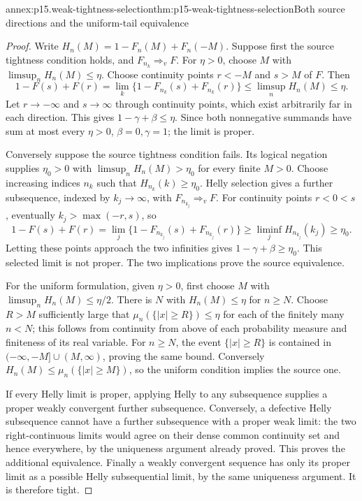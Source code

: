 \begin{annexitem}{annex:p15.weak-tightness-selection}{thm:p15-weak-tightness-selection}{Both source directions and the uniform-tail equivalence}
\begin{proof}
Write \(H_n(M)=1-F_n(M)+F_n(-M)\).
Suppose first the source tightness condition holds, and
\(F_{n_k}\Rightarrow_v F\).
For \(\eta>0\), choose \(M\) with \(\limsup_nH_n(M)\leq\eta\).
Choose continuity points \(r<-M\) and \(s>M\) of \(F\).
Then
\[
 1-F(s)+F(r)
   =\lim_k\{1-F_{n_k}(s)+F_{n_k}(r)\}
   \leq\limsup_nH_n(M)\leq\eta.
\]
Let \(r\to-\infty\) and \(s\to\infty\) through continuity
points, which exist arbitrarily far in each direction.
This gives \(1-\gamma+\beta\leq\eta\).
Since both nonnegative summands have sum at most every
\(\eta>0\), \(\beta=0,\gamma=1\); the limit is proper.

Conversely suppose the source tightness condition fails.
Its logical negation supplies \(\eta_0>0\) with
\(\limsup_nH_n(M)>\eta_0\) for every finite \(M>0\).
Choose increasing indices \(n_k\) such that \(H_{n_k}(k)\geq\eta_0\).
Helly selection gives a further subsequence, indexed by
\(k_j\to\infty\), with \(F_{n_{k_j}}\Rightarrow_v F\).
For continuity points \(r<0<s\), eventually \(k_j>\max(-r,s)\),
so
\[
 1-F(s)+F(r)
 =\lim_j\{1-F_{n_{k_j}}(s)+F_{n_{k_j}}(r)\}
 \geq\liminf_jH_{n_{k_j}}(k_j)\geq\eta_0.
\]
Letting these points approach the two infinities gives
\(1-\gamma+\beta\geq\eta_0\). This selected limit is not proper.
The two implications prove the source equivalence.

For the uniform formulation, given \(\eta>0\), first choose
\(M\) with \(\limsup_nH_n(M)\leq\eta/2\).
There is \(N\) with \(H_n(M)\leq\eta\) for \(n\geq N\).
Choose \(R>M\) sufficiently large that
\(\mu_n(\{|x|\geq R\})\leq\eta\) for each of the finitely
many \(n<N\); this follows from continuity from above of
each probability measure and finiteness of its real variable.
For \(n\geq N\), the event \(\{|x|\geq R\}\) is contained
in \((-\infty,-M]\cup(M,\infty)\), proving the same bound.
Conversely \(H_n(M)\leq\mu_n(\{|x|\geq M\})\), so the
uniform condition implies the source one.

If every Helly limit is proper, applying Helly to any
subsequence supplies a proper weakly convergent further
subsequence. Conversely, a defective Helly subsequence
cannot have a further subsequence with a proper weak limit:
the two right-continuous limits would agree on their dense
common continuity set and hence everywhere, by the uniqueness
argument already proved. This proves the additional equivalence.
Finally a weakly convergent sequence has only its proper
limit as a possible Helly subsequential limit, by the same
uniqueness argument. It is therefore tight.
\end{proof}
\end{annexitem}

